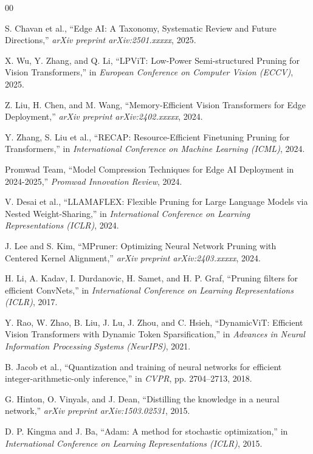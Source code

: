 \documentclass[11pt, conference]{IEEEtran}
\begin{document}
\begin{thebibliography}{00}

S. Chavan et al., ``Edge AI: A Taxonomy, Systematic Review and Future Directions,'' \textit{arXiv preprint arXiv:2501.xxxxx}, 2025.

X. Wu, Y. Zhang, and Q. Li, ``LPViT: Low-Power Semi-structured Pruning for Vision Transformers,'' in \textit{European Conference on Computer Vision (ECCV)}, 2025.

Z. Liu, H. Chen, and M. Wang, ``Memory-Efficient Vision Transformers for Edge Deployment,'' \textit{arXiv preprint arXiv:2402.xxxxx}, 2024.

Y. Zhang, S. Liu et al., ``RECAP: Resource-Efficient Finetuning Pruning for Transformers,'' in \textit{International Conference on Machine Learning (ICML)}, 2024.

Promwad Team, ``Model Compression Techniques for Edge AI Deployment in 2024-2025,'' \textit{Promwad Innovation Review}, 2024.

V. Desai et al., ``LLAMAFLEX: Flexible Pruning for Large Language Models via Nested Weight-Sharing,'' in \textit{International Conference on Learning Representations (ICLR)}, 2024.

J. Lee and S. Kim, ``MPruner: Optimizing Neural Network Pruning with Centered Kernel Alignment,'' \textit{arXiv preprint arXiv:2403.xxxxx}, 2024.

H. Li, A. Kadav, I. Durdanovic, H. Samet, and H. P. Graf, ``Pruning filters for efficient ConvNets,'' in \textit{International Conference on Learning Representations (ICLR)}, 2017.

Y. Rao, W. Zhao, B. Liu, J. Lu, J. Zhou, and C. Hsieh, ``DynamicViT: Efficient Vision Transformers with Dynamic Token Sparsification,'' in \textit{Advances in Neural Information Processing Systems (NeurIPS)}, 2021.

B. Jacob et al., ``Quantization and training of neural networks for efficient integer-arithmetic-only inference,'' in \textit{CVPR}, pp. 2704--2713, 2018.

G. Hinton, O. Vinyals, and J. Dean, ``Distilling the knowledge in a neural network,'' \textit{arXiv preprint arXiv:1503.02531}, 2015.

D. P. Kingma and J. Ba, ``Adam: A method for stochastic optimization,'' in \textit{International Conference on Learning Representations (ICLR)}, 2015.


\end{thebibliography}
\end{document}
